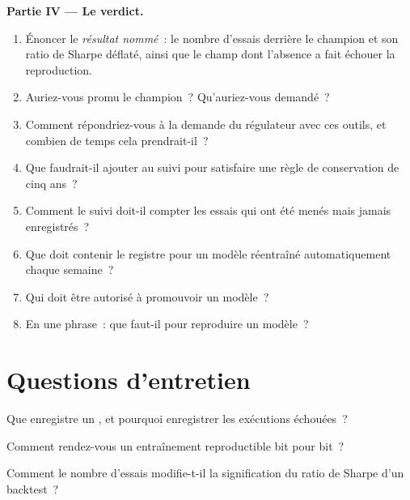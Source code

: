 \begin{problem}
\medskip\noindent\textbf{Partie IV --- Le verdict.}
\begin{enumerate}[resume]
\item Énoncer le \emph{résultat nommé}~: le nombre d'essais derrière le champion et son ratio de Sharpe déflaté, ainsi que le champ dont
l'absence a fait échouer la reproduction.
\item Auriez-vous promu le champion~? Qu'auriez-vous demandé~?
\item Comment répondriez-vous à la demande du régulateur avec ces outils, et combien de temps cela prendrait-il~?
\item Que faudrait-il ajouter au suivi pour satisfaire une règle de conservation de cinq ans~?
\item Comment le suivi doit-il compter les essais qui ont été menés mais jamais enregistrés~?
\item Que doit contenir le registre pour un modèle réentraîné automatiquement chaque semaine~?
\item Qui doit être autorisé à promouvoir un modèle~?
\item En une phrase~: que faut-il pour reproduire un modèle~?
\end{enumerate}
\end{problem}

\section{Questions d'entretien}

\begin{interviewq}\label{iq:ml:experiment-tracking-and-reproducibility:1}
Que enregistre un , et pourquoi enregistrer les exécutions échouées~?
\end{interviewq}

\begin{interviewq}\label{iq:ml:experiment-tracking-and-reproducibility:2}
Comment rendez-vous un entraînement reproductible bit pour bit~?
\end{interviewq}

\begin{interviewq}\label{iq:ml:experiment-tracking-and-reproducibility:3}
Comment le nombre d'essais modifie-t-il la signification du ratio de Sharpe d'un backtest~?
\end{interviewq}

